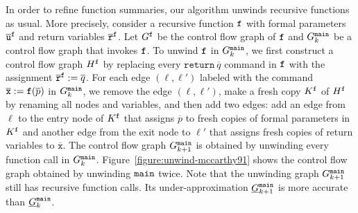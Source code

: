 In order to refine function summaries, our algorithm unwinds recursive
functions as usual. More precisely, consider a recursive function
$\mathtt{{f}}$ with formal parameters $\overline{\mathtt{u}}^{\mathtt{{f}}}$
and return variables $\overline{\mathtt{r}}^{\mathtt{{f}}}$.
Let $G^{\mathtt{{f}}}$ be the control flow graph of $\mathtt{{f}}$ and $G^{\mathtt{{main}}}_k$
be a control flow graph that invokes $\mathtt{{f}}$.
To unwind $\mathtt{{f}}$ in $G^{\mathtt{{main}}}_k$,
we first construct a control flow graph $H^{\mathtt{{f}}}$ by
replacing every $\mathtt{return}\ \overline{q}$ command in
$\mathtt{{f}}$ with the assignment $\mathtt{\overline{r}}^{\mathtt{{f}}} :=
\overline{q}$. For each edge $(\ell,  
\ell')$ labeled with the command $\overline{\mathtt{x}} :=
\mathtt{{f}}(\overline{p})$ in $G^{\mathtt{{main}}}_k$, we remove
the edge $(\ell, \ell')$, make a fresh copy $K^{\mathtt{{f}}}$ of $H^{\mathtt{{f}}}$ by
renaming all nodes and variables, and then add two edges: add an edge
from $\ell$ to the entry node of $K^{\mathtt{{f}}}$ that assigns
$\overline{p}$ to fresh copies of formal parameters in 
$K^{\mathtt{{f}}}$ and another edge from the exit node to $\ell'$ that
assigns fresh copies of return variables to
$\overline{\mathtt{x}}$. The control flow graph $G^{\mathtt{{main}}}_{k+1}$ 
is obtained by unwinding every function call in $G^{\mathtt{{main}}}_k$. 
Figure~\ref{figure:unwind-mccarthy91} shows the control flow graph
obtained by unwinding $\mathtt{{main}}$ twice. Note that the
unwinding graph $G^{\mathtt{{main}}}_{k+1}$ still has recursive function calls. Its
under-approximation $\underline{G}^{\mathtt{{main}}}_{k+1}$ is more
accurate than $\underline{G}^{\mathtt{{main}}}_k$. 


